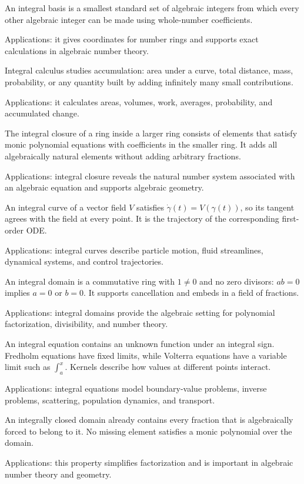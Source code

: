 An integral basis is a smallest standard set of algebraic integers from which every other algebraic integer can be made using whole-number coefficients. \par\noindent Applications: it gives coordinates for number rings and supports exact calculations in algebraic number theory.

Integral calculus studies accumulation: area under a curve, total distance, mass, probability, or any quantity built by adding infinitely many small contributions. \par\noindent Applications: it calculates areas, volumes, work, averages, probability, and accumulated change.

The integral closure of a ring inside a larger ring consists of elements that satisfy monic polynomial equations with coefficients in the smaller ring. It adds all algebraically natural elements without adding arbitrary fractions. \par\noindent Applications: integral closure reveals the natural number system associated with an algebraic equation and supports algebraic geometry.

An integral curve of a vector field $V$ satisfies $\dot\gamma(t)=V(\gamma(t))$, so its tangent agrees with the field at every point. It is the trajectory of the corresponding first-order ODE. \par\noindent Applications: integral curves describe particle motion, fluid streamlines, dynamical systems, and control trajectories.

An integral domain is a commutative ring with $1\ne0$ and no zero divisors: $ab=0$ implies $a=0$ or $b=0$. It supports cancellation and embeds in a field of fractions. \par\noindent Applications: integral domains provide the algebraic setting for polynomial factorization, divisibility, and number theory.

An integral equation contains an unknown function under an integral sign. Fredholm equations have fixed limits, while Volterra equations have a variable limit such as $\int_a^x$. Kernels describe how values at different points interact. \par\noindent Applications: integral equations model boundary-value problems, inverse problems, scattering, population dynamics, and transport.

An integrally closed domain already contains every fraction that is algebraically forced to belong to it. No missing element satisfies a monic polynomial over the domain. \par\noindent Applications: this property simplifies factorization and is important in algebraic number theory and geometry.

